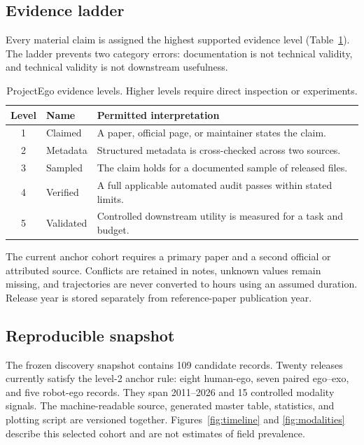 \documentclass{article}
\begin{document}
\subsection{Evidence ladder}

Every material claim is assigned the highest supported evidence level (Table~\ref{tab:evidence}). The ladder prevents two category errors: documentation is not technical validity, and technical validity is not downstream usefulness.

\begin{table}[t]
\caption{ProjectEgo evidence levels. Higher levels require direct inspection or experiments.}
\label{tab:evidence}
\centering
\small
\begin{tabular}{clp{3.3in}}
\toprule
Level & Name & Permitted interpretation \\
\midrule
1 & Claimed & A paper, official page, or maintainer states the claim. \\
2 & Metadata & Structured metadata is cross-checked across two sources. \\
3 & Sampled & The claim holds for a documented sample of released files. \\
4 & Verified & A full applicable automated audit passes within stated limits. \\
5 & Validated & Controlled downstream utility is measured for a task and budget. \\
\bottomrule
\end{tabular}
\end{table}

The current anchor cohort requires a primary paper and a second official or attributed source. Conflicts are retained in notes, unknown values remain missing, and trajectories are never converted to hours using an assumed duration. Release year is stored separately from reference-paper publication year.

\subsection{Reproducible snapshot}

The frozen discovery snapshot contains 109 candidate records. Twenty releases currently satisfy the level-2 anchor rule: eight human-ego, seven paired ego--exo, and five robot-ego records. They span 2011--2026 and 15 controlled modality signals. The machine-readable source, generated master table, statistics, and plotting script are versioned together. Figures~\ref{fig:timeline} and \ref{fig:modalities} describe this selected cohort and are not estimates of field prevalence.
\end{document}
